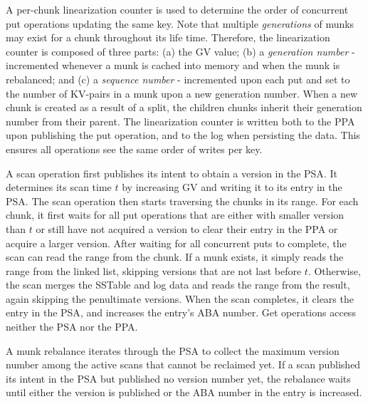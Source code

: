 \documentclass[sigplan,10pt]{acmart}
\newcommand{\code}[1]{\textsf{\fontsize{9}{11}\selectfont #1}}
\newcommand{\remove}[1]{}
\begin{document}
{%
A per-chunk linearization counter is used to determine the order of concurrent put operations updating the same key.  
Note that multiple \emph{generations} of munks may exist for a chunk throughout its life time.
Therefore, the linearization counter is composed of three parts: (a) the GV value; (b) a \emph{generation number} - incremented whenever a munk is cached into memory and when the munk is rebalanced; and (c) a \emph{sequence number} - incremented upon each put and set to the number of KV-pairs in a munk upon a new generation number. When a new chunk is created as a result of a split, the children chunks inherit their generation number from their parent. The linearization counter is written both to the \code{PPA} upon publishing the put operation, and to the \code{log} when persisting the data. This ensures all operations see the same order of writes per key.

A scan operation first publishes its intent to obtain a version in the \code{PSA}. It determines its scan time $t$ by increasing GV and writing it to its entry in the \code{PSA}. The scan operation then starts traversing the chunks in its range. For each chunk, it first waits for all put operations that are either with smaller version than $t$ or still have not acquired a version to clear their entry in the \code{PPA} or acquire a larger version. After waiting for all concurrent puts to complete, the scan  can read the range from the chunk. If a munk exists, it simply reads the range from the linked list, skipping versions that are not last before $t$. Otherwise, the scan merges the \code{SSTable} and \code{log} data and reads the range from the result, again skipping the penultimate versions. When the scan completes, it clears the entry in the \code{PSA}, and increases the entry's ABA number. Get operations access neither the \code{PSA} nor the \code{PPA}.%

A munk rebalance iterates through the \code{PSA} to collect the maximum version number among the active scans that cannot be reclaimed yet. If a scan published its intent in the \code{PSA} but published no version number yet, the rebalance waits until either the version is published or the ABA number in the entry is increased. 
\remove{It then acquires the chunk's lock to block additional put operation. If executing a funk rebalance it also acquires the funk rebalance lock for the chunk. After completing the rebalance operation and placing the new content of the chunk in place including the updated metadata, all locks are promoted.
}
}
\end{document}
